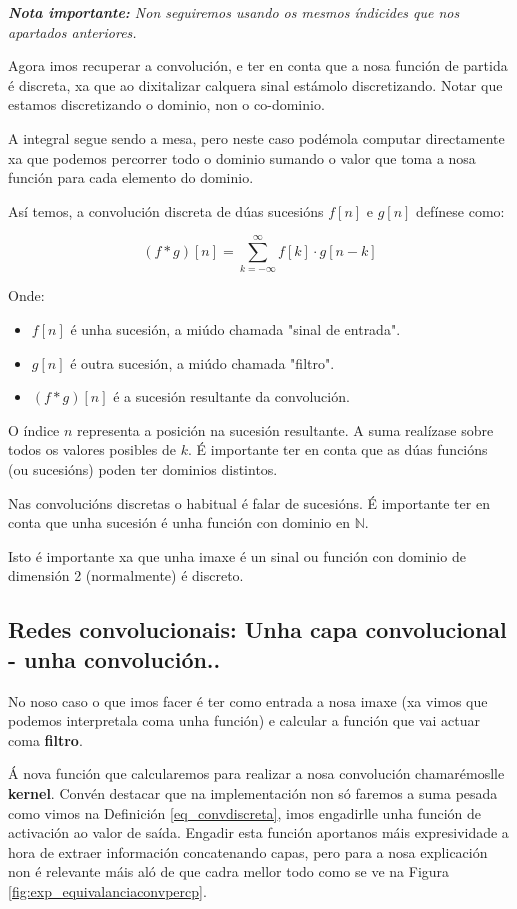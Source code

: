 \documentclass{article}
\begin{document}
\textit{\textbf{Nota importante: }Non seguiremos usando os mesmos índicides que nos apartados anteriores. }

Agora imos recuperar a convolución, e ter en conta que a nosa función de partida é discreta, xa que ao dixitalizar calquera sinal estámolo discretizando. Notar que estamos discretizando o dominio, non o co-dominio. 

A integral segue sendo a mesa, pero neste caso podémola computar directamente xa que podemos percorrer todo o dominio sumando o valor que toma a nosa función para cada elemento do dominio.

Así temos, a convolución discreta de dúas sucesións $f[n]$ e $g[n]$ defínese como:

\begin{equation}
    (f * g)[n] = \sum_{k=-\infty}^{\infty} f[k] \cdot g[n - k]
    \label{eq_convdiscreta}
\end{equation}

Onde:
\begin{itemize}
\item $f[n]$ é unha sucesión, a miúdo chamada "sinal de entrada".
\item $g[n]$ é outra sucesión, a miúdo chamada "filtro".
\item $(f * g)[n]$ é a sucesión resultante da convolución.
\end{itemize}

O índice $n$ representa a posición na sucesión resultante. A suma realízase sobre todos os valores posibles de $k$. É importante ter en conta que as dúas funcións (ou sucesións) poden ter dominios distintos. 

Nas convolucións discretas o habitual é falar de sucesións. É importante ter en conta que unha sucesión é unha función con dominio en $\mathbb{N}$.

Isto é importante xa que unha imaxe é un sinal ou función con dominio de dimensión 2 (normalmente) é discreto. 

\subsection{Redes convolucionais: Unha capa convolucional - unha convolución..}


No noso caso o que imos facer é ter como entrada a nosa imaxe (xa vimos que podemos interpretala coma unha función) e calcular a función que vai actuar coma \textbf{filtro}. 

Á nova función que calcularemos para realizar a nosa convolución chamarémoslle \textbf{kernel}. Convén destacar que na implementación non só faremos a suma pesada como vimos na Definición \ref{eq_convdiscreta}, imos engadirlle unha función de activación ao valor de saída. Engadir esta función aportanos máis expresividade a hora de extraer información concatenando capas, pero para a nosa explicación non é relevante máis aló de que cadra mellor todo como se ve na Figura \ref{fig:exp_equivalanciaconvpercp}.
\end{document}
